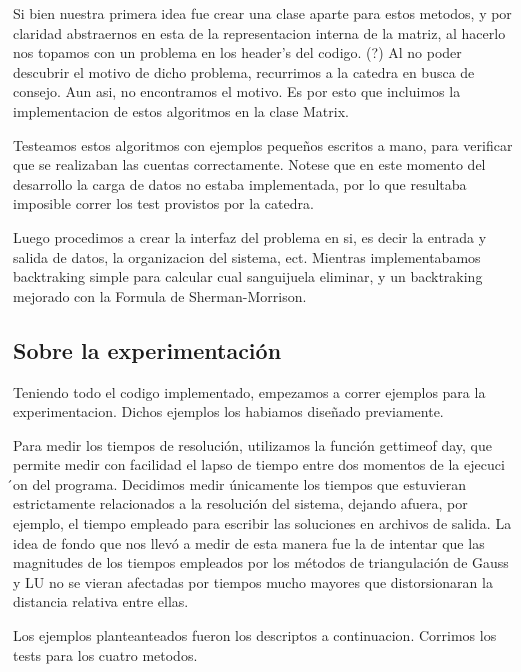 Si bien nuestra primera idea fue crear una clase aparte para estos metodos, y por claridad abstraernos en esta de la 
representacion interna de la matriz, al hacerlo nos topamos con un problema en los header's del codigo. (?) Al no poder descubrir el motivo
de dicho problema, recurrimos a la catedra en busca de consejo. Aun asi, no encontramos el motivo. Es por esto que incluimos la implementacion de
estos algoritmos en la clase Matrix. 

Testeamos estos algoritmos con ejemplos peque\~nos escritos a mano, para verificar que se realizaban las cuentas correctamente. Notese que en 
este momento del desarrollo la carga de datos no estaba implementada, por lo que resultaba imposible correr los test provistos por la catedra.

Luego procedimos a crear la interfaz del problema en si, es decir la entrada y salida de datos, la organizacion del sistema, ect. Mientras 
implementabamos backtraking simple para calcular cual sanguijuela eliminar, y un backtraking mejorado con la Formula de Sherman-Morrison. 


\subsection{Sobre la experimentaci\'on}

Teniendo todo el codigo implementado, empezamos a correr ejemplos para la experimentacion. Dichos ejemplos los habiamos dise\~nado previamente.

Para medir los tiempos de resoluci\'on, utilizamos la funci\'on gettimeof day, que permite medir con
facilidad el lapso de tiempo entre dos momentos de la ejecuci ́on del programa. Decidimos medir
\'unicamente los tiempos que estuvieran estrictamente relacionados a la resoluci\'on del sistema,
dejando afuera, por ejemplo, el tiempo empleado para escribir las soluciones en archivos de salida. La
idea de fondo que nos llev\'o a medir de esta manera fue la de intentar que las magnitudes de los tiempos
empleados por los m\'etodos de triangulaci\'on de Gauss y LU no se vieran afectadas por tiempos mucho
mayores que distorsionaran la distancia relativa entre ellas.

Los ejemplos planteanteados fueron los descriptos a continuacion. Corrimos los tests para los cuatro metodos.


